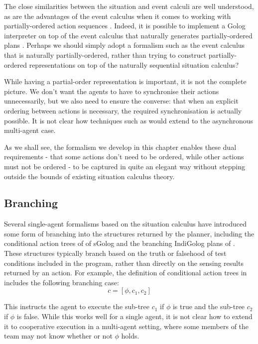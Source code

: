 The close similarities between the situation and event calculi are
well understood, as are the advantages of the event calculus when
it comes to working with partially-ordered action sequences \citep{belleghem97sitcalc_evtcalc}.
Indeed, it is possible to implement a Golog interpreter on top of
the event calculus that naturally generates partially-ordered plans
\citep{pereira04ec_golog}. Perhaps we should simply adopt a formalism
such as the event calculus that is naturally partially-ordered, rather
than trying to construct partially-ordered representations on top
of the naturally sequential situation calculus?

While having a partial-order representation is important, it is not
the complete picture. We don't want the agents to have to synchronise
their actions unnecessarily, but we also need to ensure the converse:
that when an explicit ordering between actions is necessary, the required
synchronisation is actually possible. It is not clear how techniques
such as \citep{pereira04ec_golog} would extend to the asynchronous
multi-agent case.

As we shall see, the formalism we develop in this chapter enables
these dual requirements - that some actions don't need to be ordered,
while other actions must not be ordered - to be captured in quite
an elegant way without stepping outside the bounds of existing situation
calculus theory.


\subsection{Branching}

Several single-agent formalisms based on the situation calculus have
introduced some form of branching into the structures returned by
the planner, including the conditional action trees of of sGolog \citep{lakemeyer99golog_cats}
and the branching IndiGolog plans of \citep{giacomo04sem_delib_indigolog}.
These structures typically branch based on the truth or falsehood
of test conditions included in the program, rather than directly on
the sensing results returned by an action. For example, the definition
of conditional action trees in \citep{lakemeyer99golog_cats} includes
the following branching case:\[
c=[\phi,c_{1},c_{2}]\]


This instructs the agent to execute the sub-tree $c_{1}$ if $\phi$
is true and the sub-tree $c_{2}$ if $\phi$ is false. While this
works well for a single agent, it is not clear how to extend it to
cooperative execution in a multi-agent setting, where some members
of the team may not know whether or not $\phi$ holds.


